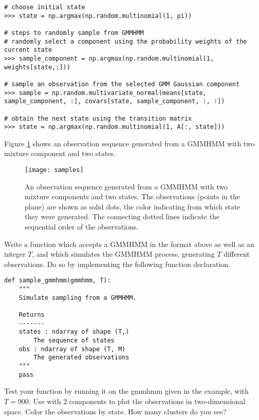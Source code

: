 \begin{lstlisting}
# choose initial state
>>> state = np.argmax(np.random.multinomial(1, pi))

# steps to randomly sample from GMMHMM
# randomly select a component using the probability weights of the current state
>>> sample_component = np.argmax(np.random.multinomial(1, weights[state,:]))

# sample an observation from the selected GMM Gaussian component 
>>> sample = np.random.multivariate_normal(means[state, sample_component, :], covars[state, sample_component, :, :])

# obtain the next state using the transition matrix
>>> state = np.argmax(np.random.multinomial(1, A[:, state]))
\end{lstlisting}

Figure \ref{fig:samples} shows an observation sequence generated from a GMMHMM with two mixture component and two states.

\begin{figure}
\centering
\texttt{[image: samples]}
\caption{An observation sequence generated from a GMMHMM with two mixture components and two states.
The observations (points in the plane) are shown as solid dots, the color indicating from which
state they were generated. The connecting dotted lines indicate the sequential order of the observations.}
\label{fig:samples}
\end{figure}

\begin{problem}
Write a function which accepts a GMMHMM in the format above as well as an integer $T$, and which simulates the GMMHMM process, generating $T$ different observations.
Do so by implementing the following function declaration.
\begin{lstlisting}
def sample_gmmhmm(gmmhmm, T):
    """
    Simulate sampling from a GMMHMM.

    Returns
    -------
    states : ndarray of shape (T,)
        The sequence of states
    obs : ndarray of shape (T, M)
        The generated observations
    """
    pass
\end{lstlisting}

Test your function by running it on the gmmhmm given in the example, with $T=900$.
Use  with 2 components to plot the observations in two-dimensional space. 
Color the observations by state. How many clusters do you see?
\end{problem}
\newpage

